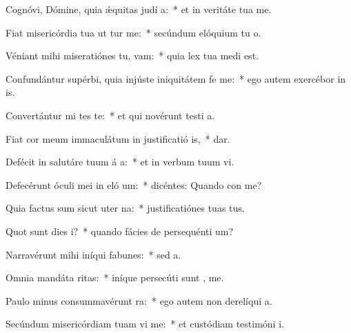 \item Cognóvi, Dómine, quia ǽquitas judí a:~* et in veritáte tua  me.
\item Fiat misericórdia tua ut tur me:~* secúndum elóquium tu  o.
\item Véniant mihi miseratiónes tu,  vam:~* quia lex tua medi  est.
\item Confundántur supérbi, quia injúste iniquitátem fe  me:~* ego autem exercébor in  is.
\item Convertántur mi tes te:~* et qui novérunt testi a.
\item Fiat cor meum immaculátum in justificatió is,~*   dar.
\item Defécit in salutáre tuum á a:~* et in verbum tuum vi.
\item Defecérunt óculi mei in eló um:~* dicéntes: Quando con me?
\item Quia factus sum sicut uter  na:~* justificatiónes tuas   tus.
\item Quot sunt dies  i?~* quando fácies de persequénti  um?
\item Narravérunt mihi iníqui fabunes:~* sed    a.
\item Omnia mandáta  ritas:~* iníque persecúti sunt ,  me.
\item Paulo minus consummavérunt   ra:~* ego autem non derelíqui  a.
\item Secúndum misericórdiam tuam vi me:~* et custódiam testimóni  i.
